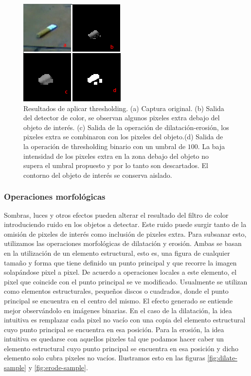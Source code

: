 \begin{figure}[tpb]
\begin{center}
  \includegraphics[scale=0.8]{figuras/threshold.png}
\end{center}
  \caption{\small Resultados de aplicar thresholding. (a) Captura original. (b) Salida del detector de color, se observan algunos pixeles extra debajo del objeto de interés. (c) Salida de la operación de dilatación-erosión, los pixeles extra se combinaron con los pixeles del objeto.(d) Salida de la operación de thresholding binario con un umbral de $100$. La baja intensidad de los pixeles extra en la zona debajo del objeto no supera el umbral propuesto y por lo tanto son descartados. El contorno del objeto de interés se conserva aislado.} 
  \label{fig:threshold}
\end{figure}

	\subsubsection{\label{sec:morph} Operaciones morfológicas}
Sombras, luces y otros efectos pueden alterar el resultado del filtro 
de color introduciendo ruido en los objetos a detectar. Este ruido 
puede surgir tanto de la omisión de pixeles de interés como  inclusión de pixeles extra. Para subsanar esto, utilizamos las operaciones morfológicas de dilatación y erosión. Ambas se basan en la utilización de un elemento estructural, esto es, una figura de cualquier tamaño y forma que tiene definido un punto principal y que recorre la imagen solapándose pixel a pixel. De acuerdo a operaciones locales a este elemento, el pixel que coincide con el punto principal se ve modificado. Usualmente se utilizan como elementos estructurales, pequeños discos o cuadrados, donde el punto principal se encuentra en el centro del mismo. El efecto generado se entiende mejor observándolo en imágenes binarias. En el caso de la dilatación, la idea intuitiva es remplazar cada pixel no vacío con una copia del elemento estructural cuyo punto principal se encuentra en esa posición. Para la erosión, la idea intuitiva es quedarse con aquellos pixeles tal que podamos hacer caber un elemento estructural cuyo punto principal se encuentra en esa posición y dicho elemento solo cubra pixeles no vacíos.
Ilustramos esto en las figuras \ref{fig:dilate-sample} y \ref{fig:erode-sample}.


